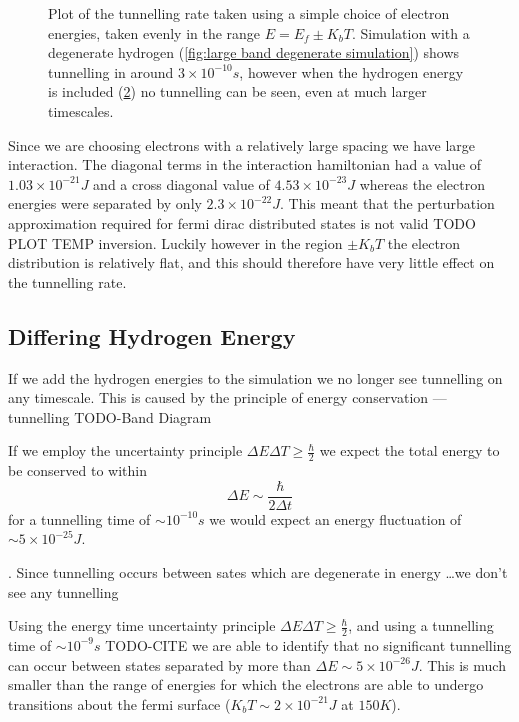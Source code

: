 \begin{figure}[htb]
\begin{subfigure}{0.45\linewidth}
        \label{fig:large band non degenerate simulation}
    \end{subfigure}
    \caption{Plot of the tunnelling rate taken using a
    simple choice of electron energies,
    taken evenly in the range \(E=E_f \pm K_b T\).
    Simulation with a degenerate hydrogen
    (\cref{fig:large band degenerate simulation})
    shows tunnelling in around
    \(3\times{}10^{-10}s\), however when the
    hydrogen energy is included (\cref{fig:large band non degenerate simulation})
    no tunnelling can be seen, even
    at much larger timescales.}
\end{figure}

Since we are choosing electrons
with a relatively large spacing
we have large
interaction. The diagonal terms in
the interaction hamiltonian
had a value of \(1.03\times{}10^{-21}J\)
and a cross diagonal value of \(4.53\times{}10^{-23}J\)
whereas the electron energies were separated
by only \(2.3\times{}10^{-22}J\). This meant that
the perturbation approximation required for
fermi dirac distributed states is not valid TODO PLOT TEMP inversion.
Luckily however in the region \(\pm K_b T\)
the electron distribution is relatively flat,
and this should therefore have very little
effect on the tunnelling rate.

\subsection{Differing Hydrogen Energy}
If we add the hydrogen energies to the
simulation we no longer see tunnelling
on any timescale. This is caused by the
principle of energy conservation --- tunnelling
TODO-Band Diagram

If we employ the uncertainty principle
\(\Delta{}E\Delta{}T \geq \frac{\hbar}{2}\)
we expect the total energy to be conserved
to within
\begin{equation}
    \Delta{}E \sim \frac{\hbar}{2\Delta{} t}
\end{equation}
for a tunnelling time of \(\sim 10^{-10}s\)
we would expect an energy fluctuation
of \(\sim 5\times{}10^{-25} J\).


. Since tunnelling occurs between sates which are
degenerate in energy \ldots we don't see any tunnelling

Using the energy time uncertainty principle
\(\Delta{}E\Delta{}T \geq \frac{\hbar}{2}\), and
using a tunnelling time of \(\sim 10^{-9}s\) TODO-CITE
we are able to identify that no significant tunnelling
can occur between states separated by more than
\(\Delta{}E \sim 5\times{}10^{-26} J\). This is
much smaller than the range of energies for
which the electrons are able to undergo
transitions about the fermi surface
(\(K_b T \sim 2 \times 10^{-21}J\) at \(150K\)).


